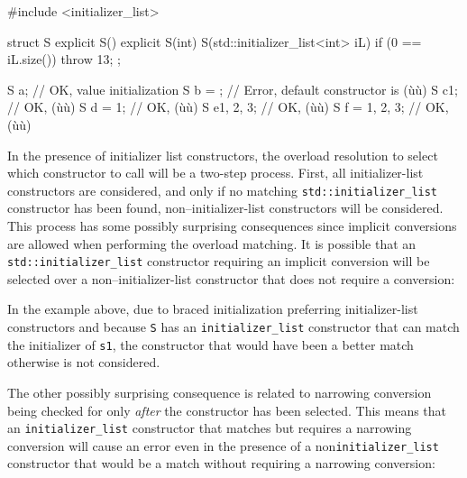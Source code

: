 \begin{emcppslisting}
#include <initializer_list>

struct S {
  explicit S() {}
  explicit S(int) {}
  S(std::initializer_list<int> iL) { if (0 == iL.size()) {throw 13;} }
};

S a{};            // OK, value initialization
S b = {};         // Error, default constructor is (ù{}ù)
S c{1};           // OK, (ù{}ù)
S d = {1};        // OK, (ù{}ù)
S e{1, 2, 3};     // OK, (ù{}ù)
S f = {1, 2, 3};  // OK, (ù{}ù)
\end{emcppslisting}


\noindent In the presence of initializer list constructors, the overload
resolution to select which constructor to call will be a two-step
process. First, all initializer-list constructors are considered, and
only if no matching \lstinline!std::initializer_list! constructor has been
found, non--initializer-list constructors will be considered. This
process has some possibly surprising consequences since implicit
conversions are allowed when performing the overload matching. It is
possible that an \lstinline!std::initializer_list! constructor requiring
an implicit conversion will be selected over a non--initializer-list
constructor that does not require a conversion:



\noindent In the example above, due to braced initialization preferring
initializer-list constructors and because \lstinline!S! has an
\lstinline!initializer_list! constructor that can match the initializer of
\lstinline!s1!, the constructor that would have been a better match
otherwise is not considered.

The other possibly surprising consequence is related to narrowing
conversion being checked for only \emph{after} the constructor has been
selected. This means that an \lstinline!initializer_list! constructor that
matches but requires a narrowing conversion will cause an error even in
the presence of a non\lstinline!initializer_list! constructor that would
be a match without requiring a narrowing conversion:


